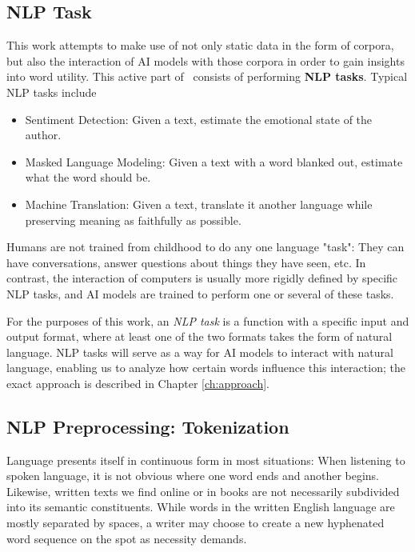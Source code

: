 \subsection{NLP Task}
This work attempts to make use of not only static data in the form of corpora, but also the interaction of AI models with those corpora in order to gain insights into word utility.
This active part of \NLP\ consists of performing \textbf{NLP tasks}.
Typical NLP tasks include \cite{jurafskySpeechLanguageProcessing2025}

\begin{itemize}
	\item Sentiment Detection: Given a text, estimate the emotional state of the author.
	\item Masked Language Modeling: Given a text with a word blanked out, estimate what the word should be.
	\item Machine Translation: Given a text, translate it another language while preserving meaning as faithfully as possible.
\end{itemize}


Humans are not trained from childhood to do any one language "task":
They can have conversations, answer questions about things they have seen, etc.
In contrast, the interaction of computers is usually more rigidly defined by specific NLP tasks, and AI models are trained to perform one or several of these tasks.

For the purposes of this work, an \textit{NLP task} is a function with a specific input and output format, where at least one of the two formats takes the form of natural language.
NLP tasks will serve as a way for AI models to interact with natural language, enabling us to analyze how certain words influence this interaction; the exact approach is described in Chapter \ref{ch:approach}.


\subsection{NLP Preprocessing: Tokenization}
Language presents itself in continuous form in most situations:
When listening to spoken language, it is not obvious where one word ends and another begins.
Likewise, written texts we find online or in books are not necessarily subdivided into its semantic constituents.
While words in the written English language are mostly separated by spaces, a writer may choose to create a new hyphenated word sequence on the spot as necessity demands.

